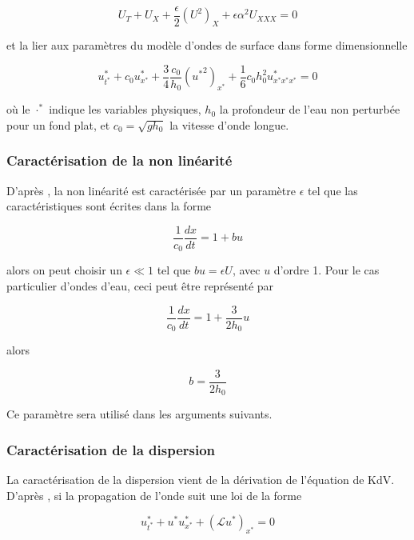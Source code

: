 \begin{equation}
\label{eq:scaledKdV}
U_T + U_X + \frac{\epsilon}{2} (U^2)_X + \epsilon\alpha^2U_{XXX} = 0
\end{equation}

\noindent et la lier aux paramètres du modèle d'ondes de surface dans forme dimensionnelle \cite{Khorsand2014}

\begin{equation*}
    u^*_{t^*} + c_0u^*_{x^*} + \frac{3}{4}\frac{c_0}{h_0}({u^*}^2)_{x^*} + \frac{1}{6}c_0h_0^2u^*_{x^*x^*x^*} = 0 
\end{equation*}

\noindent où le $\cdot^*$ indique les variables physiques, $h_0$ la profondeur de l'eau non perturbée pour un fond plat, et $c_0 = \sqrt{gh_0}$ la vitesse d'onde longue.

\subsubsection{Caractérisation de la non linéarité}

\indent D'après \cite{BBM1971}, la non linéarité est caractérisée par un paramètre $\epsilon$ tel que las caractéristiques sont écrites dans la forme

$$ \frac{1}{c_0} \frac{dx}{dt} = 1+ bu$$

\noindent alors on peut choisir un $\epsilon \ll 1$ tel que  $bu=\epsilon U$, avec $u$ d'ordre 1. Pour le cas particulier d'ondes d'eau, ceci peut être représenté par

$$ \frac{1}{c_0} \frac{dx}{dt} = 1 + \frac{3}{2h_0}u$$

\noindent alors 

\begin{equation}
\label{eq:analysisb}
b = \frac{3}{2h_0}
\end{equation} 

\indent Ce paramètre sera utilisé dans les arguments suivants.

\subsubsection{Caractérisation de la dispersion}

\indent La caractérisation de la dispersion vient de la dérivation de l'équation de KdV. D'après \cite{BBM1971}, si la propagation de l'onde suit une loi de la forme

$$ u^*_{t^*} + u^*u^*_{x^*}+(\mathcal{L} u^*)_{x^*} = 0$$

